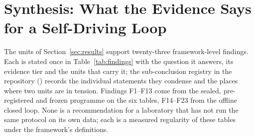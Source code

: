 \documentclass[11pt,a4paper]{article}
\begin{document}
\section{Synthesis: What the Evidence Says for a Self-Driving Loop}
\label{sec:synthesis}
The units of Section~\ref{sec:results} support twenty-three framework-level
findings. Each is stated once in Table~\ref{tab:findings} with the question it
answers, its evidence tier and the units that carry it; the sub-conclusion
registry in the repository () records the individual
statements they condense and the places where two units are in tension. Findings F1--F13 come from the sealed, pre-registered and frozen
programme on the six tables, F14--F23 from the offline closed loop. None is a
recommendation for a laboratory that has not run the same protocol on its own
data; each is a measured regularity of these tables under the framework's
definitions.
\end{document}
